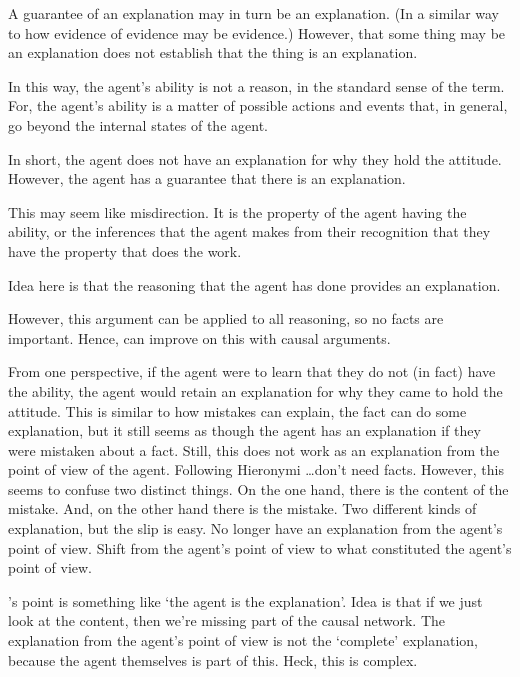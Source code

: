 \documentclass[10pt]{article}
\begin{document}
\begin{note}
  A guarantee of an explanation may in turn be an explanation.
  (In a similar way to how evidence of evidence may be evidence.)
  However, that some thing may be an explanation does not establish that the thing is an explanation.

  In this way, the agent's ability is not a reason, in the standard sense of the term.
  For, the agent's ability is a matter of possible actions and events that, in general, go beyond the internal states of the agent.

  In short, the agent does not have an explanation for why they hold the attitude.
  However, the agent has a guarantee that there is an explanation.

  This may seem like misdirection.
  It is the property of the agent having the ability, or the inferences that the agent makes from their recognition that they have the property that does the work.

  Idea here is that the reasoning that the agent has done provides an explanation.

  However, this argument can be applied to all reasoning, so no facts are important.
  Hence, can improve on this with causal arguments.

  From one perspective, if the agent were to learn that they do not (in fact) have the ability, the agent would retain an explanation for why they came to hold the attitude.
  This is similar to how mistakes can explain, the fact can do some explanation, but it still seems as though the agent has an explanation if they were mistaken about a fact.
  Still, this does not work as an explanation from the point of view of the agent.
  Following Hieronymi \dots don't need facts.
  However, this seems to confuse two distinct things.
  On the one hand, there is the content of the mistake.
  And, on the other hand there is the mistake.
  Two different kinds of explanation, but the slip is easy.
  No longer have an explanation from the agent's point of view.
  Shift from the agent's point of view to what constituted the agent's point of view.

  \citeauthor{Hieronymi:2011aa}'s point is something like `the agent is the explanation'.
  {
    \color{red}
    Idea is that if we just look at the content, then we're missing part of the causal network.
    The explanation from the agent's point of view is not the `complete' explanation, because the agent themselves is part of this.
    Heck, this is complex.
  }


\end{note}
\end{document}
